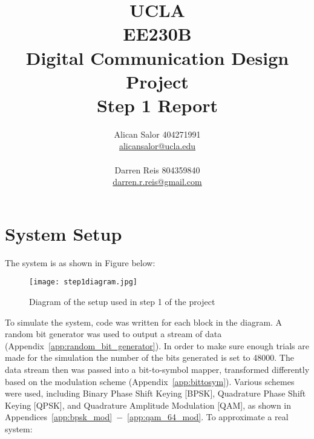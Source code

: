 \documentclass[]{article}
\title{UCLA\\EE230B\\Digital Communication Design Project\\Step 1 Report}
\author{Alican Salor 404271991 \\  \href{mailto:alicansalor@ucla.edu}{alicansalor@ucla.edu} \\ \\
Darren Reis 804359840 \\
\href{mailto:darrer.r.reis@gmail.com}{darren.r.reis@gmail.com} }
\begin{document}
\maketitle

\newpage
\tableofcontents

\newpage


\section{System Setup}
\label{sec:setup}
The system is as shown in Figure below:


\begin{figure}[H]
\centering
\texttt{[image: step1diagram.jpg]}
\caption{Diagram of the setup used in step 1 of the project}
\end{figure}

To simulate the system, code was written for each block in the diagram.  A random bit generator was used to output a stream of data (Appendix~\ref{app:random_bit_generator}). In order to make sure enough trials are made for the simulation the number of the bits generated is set to 48000. The data stream then was passed into a bit-to-symbol mapper, transformed differently based on the modulation scheme (Appendix~\ref{app:bittosym}).  Various schemes were used, including Binary Phase Shift Keying [BPSK], Quadrature Phase Shift Keying [QPSK], and Quadrature Amplitude Modulation [QAM], as shown in Appendices~\ref{app:bpsk_mod}~$-$~\ref{app:qam_64_mod}. To approximate a real system:
\end{document}
